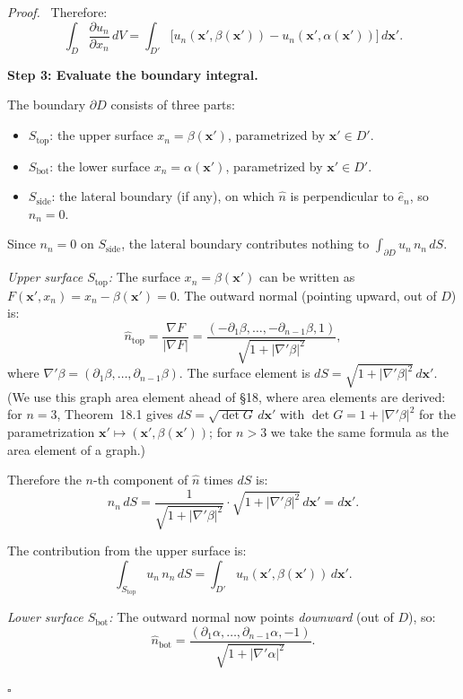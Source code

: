 \documentclass[11pt]{report}
\renewenvironment{proof}[1][Proof]{\par\noindent\textit{#1.}\ }{\hfill$\square$\par\medskip}
\newcommand{\parti}[2]{\frac{\partial #1}{\partial #2}}
\begin{document}
\begin{proof}
Therefore:
\[
\int_D \parti{u_n}{x_n} \, dV = \int_{D'} \big[ u_n(\mathbf{x}', \beta(\mathbf{x}')) - u_n(\mathbf{x}', \alpha(\mathbf{x}')) \big] \, d\mathbf{x}'. \tag{$\dagger$}
\]

\textbf{Step 3: Evaluate the boundary integral.}

The boundary $\partial D$ consists of three parts:
\begin{itemize}
    \item $S_{\text{top}}$: the upper surface $x_n = \beta(\mathbf{x}')$, parametrized by $\mathbf{x}' \in D'$.
    \item $S_{\text{bot}}$: the lower surface $x_n = \alpha(\mathbf{x}')$, parametrized by $\mathbf{x}' \in D'$.
    \item $S_{\text{side}}$: the lateral boundary (if any), on which $\hat{n}$ is perpendicular to $\hat{e}_n$, so $n_n = 0$.
\end{itemize}

Since $n_n = 0$ on $S_{\text{side}}$, the lateral boundary contributes nothing to $\int_{\partial D} u_n \, n_n \, dS$.

\textit{Upper surface $S_{\text{top}}$:} The surface $x_n = \beta(\mathbf{x}')$ can be written as $F(\mathbf{x}', x_n) = x_n - \beta(\mathbf{x}') = 0$. The outward normal (pointing upward, out of $D$) is:
\[
\hat{n}_{\text{top}} = \frac{\nabla F}{|\nabla F|} = \frac{(-\partial_1 \beta, \ldots, -\partial_{n-1} \beta, 1)}{\sqrt{1 + |\nabla' \beta|^2}},
\]
where $\nabla' \beta = (\partial_1 \beta, \ldots, \partial_{n-1} \beta)$. The surface element is $dS = \sqrt{1 + |\nabla' \beta|^2} \, d\mathbf{x}'$. (We use this graph area element ahead of \S18, where area elements are derived: for $n = 3$, Theorem~18.1 gives $dS = \sqrt{\det G}\, d\mathbf{x}'$ with $\det G = 1 + |\nabla' \beta|^2$ for the parametrization $\mathbf{x}' \mapsto (\mathbf{x}', \beta(\mathbf{x}'))$; for $n > 3$ we take the same formula as the area element of a graph.)

Therefore the $n$-th component of $\hat{n}$ times $dS$ is:
\[
n_n \, dS = \frac{1}{\sqrt{1 + |\nabla' \beta|^2}} \cdot \sqrt{1 + |\nabla' \beta|^2} \, d\mathbf{x}' = d\mathbf{x}'.
\]

The contribution from the upper surface is:
\[
\int_{S_{\text{top}}} u_n \, n_n \, dS = \int_{D'} u_n(\mathbf{x}', \beta(\mathbf{x}')) \, d\mathbf{x}'. \tag{$\dagger\dagger_1$}
\]

\textit{Lower surface $S_{\text{bot}}$:} The outward normal now points \textit{downward} (out of $D$), so:
\[
\hat{n}_{\text{bot}} = \frac{(\partial_1 \alpha, \ldots, \partial_{n-1} \alpha, -1)}{\sqrt{1 + |\nabla' \alpha|^2}}.
\]


\end{proof}
\end{document}
